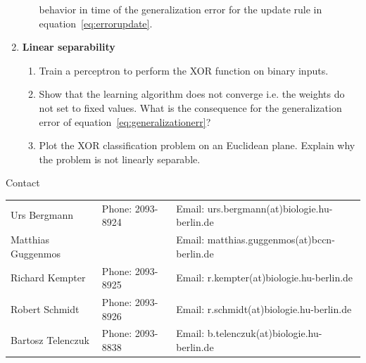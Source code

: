 \documentclass[12pt, a4]{article}
\begin{document}
\begin{enumerate}
\begin{enumerate}
                behavior in time of the generalization error for the update
                rule in equation~\ref{eq:errorupdate}.
        \end{enumerate}
    \item \textbf{Linear separability}
        \begin{enumerate}
            \item Train a perceptron to perform the XOR function on binary
                inputs.
            \item Show that the learning algorithm does not converge
                i.e. the weights do not set to fixed values. What is the
                consequence for the generalization error of
                equation~\ref{eq:generalizationerr}?
            \item Plot the XOR classification problem on an
                Euclidean plane. Explain why the problem is not
                linearly separable. 
        \end{enumerate}

\end{enumerate}

\vfill
\centerline{\CAP Contact}
\CAP

\begin{tabular}{lll}
Urs Bergmann & Phone: 2093-8924 & Email:
urs.bergmann(at)biologie.hu-berlin.de \\
Matthias Guggenmos & & Email: matthias.guggenmos(at)bccn-berlin.de \\
Richard Kempter \hfill & Phone: 2093-8925 \hfill & Email:
r.kempter(at)biologie.hu-berlin.de \\
Robert Schmidt & Phone: 2093-8926 & Email: r.schmidt(at)biologie.hu-berlin.de
\\
Bartosz Telenczuk & Phone: 2093-8838 & Email:
b.telenczuk(at)biologie.hu-berlin.de \\
\end{tabular}
\end{document}

